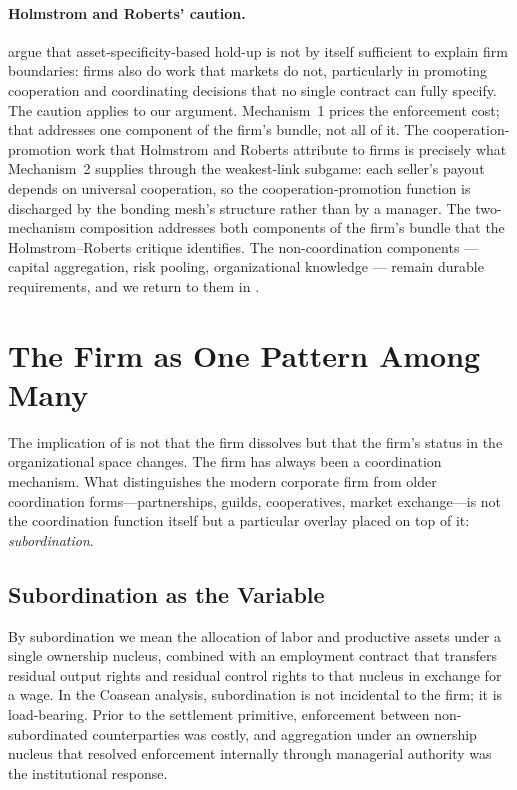 \documentclass[11pt,a4paper]{article}
\theoremstyle{definition}
\theoremstyle{remark}
\begin{document}
\paragraph{Holmstrom and Roberts' caution.}
\citet{holmstrom_roberts_1998} argue that asset-specificity-based
hold-up is not by itself sufficient to explain firm boundaries:
firms also do work that markets do not, particularly in promoting
cooperation and coordinating decisions that no single contract can
fully specify. The caution applies to our argument. Mechanism~1
prices the enforcement cost; that addresses one component of the
firm's bundle, not all of it. The cooperation-promotion work that
Holmstrom and Roberts attribute to firms is precisely what
Mechanism~2 supplies through the weakest-link subgame: each
seller's payout depends on universal cooperation, so the
cooperation-promotion function is
discharged by the bonding mesh's structure rather than by a
manager. The two-mechanism composition addresses both components
of the firm's bundle that the Holmstrom--Roberts critique
identifies. The non-coordination components --- capital aggregation,
risk pooling, organizational knowledge --- remain durable
requirements, and we return to them in
.

\section{The Firm as One Pattern Among Many}
\label{sec:patterns}

The implication of  is not that the firm
dissolves but that the firm's status in the organizational space
changes. The firm has always been a coordination mechanism. What
distinguishes the modern corporate firm from older coordination
forms---partnerships, guilds, cooperatives, market exchange---is not
the coordination function itself but a particular overlay placed on
top of it: \emph{subordination}.

\subsection{Subordination as the Variable}

By subordination we mean the allocation of labor and productive
assets under a single ownership nucleus, combined with an
employment contract that transfers residual output rights and
residual control rights to that nucleus in exchange for a wage. In
the Coasean analysis, subordination is not incidental to the firm;
it is load-bearing. Prior to the settlement primitive, enforcement
between non-subordinated counterparties was costly, and aggregation
under an ownership nucleus that resolved enforcement internally
through managerial authority was the institutional response.
\end{document}
